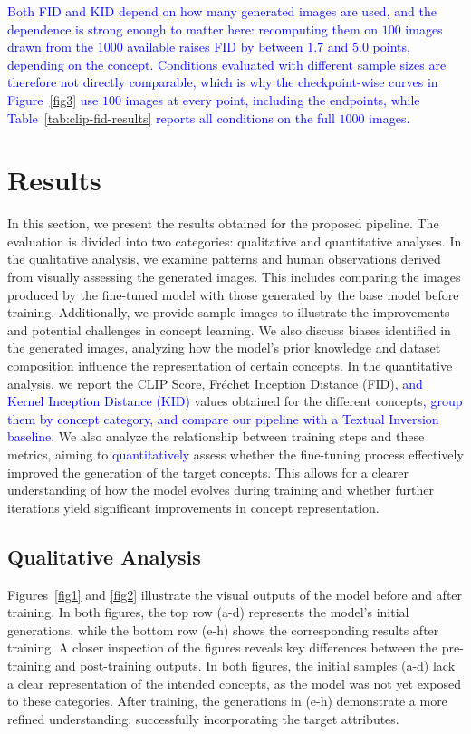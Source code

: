 \documentclass[pdflatex,sn-mathphys-num]{sn-jnl}%
\theoremstyle{thmstyleone}%
\theoremstyle{thmstyletwo}%
\theoremstyle{thmstylethree}%
\begin{document}
\textcolor{blue}{Both FID and KID depend on how many generated images are used, and the dependence is strong enough to matter here: recomputing them on $100$ images drawn from the $1000$ available raises FID by between $1.7$ and $5.0$ points, depending on the concept. Conditions evaluated with different sample sizes are therefore not directly comparable, which is why the checkpoint-wise curves in Figure~\ref{fig3} use $100$ images at every point, including the endpoints, while Table~\ref{tab:clip-fid-results} reports all conditions on the full $1000$ images.}

\section{Results}
\label{results}

In this section, we present the results obtained for the proposed pipeline. The evaluation is divided into two categories: qualitative and quantitative analyses. In the qualitative analysis, we examine patterns and human observations derived from visually assessing the generated images. This includes comparing the images produced by the fine-tuned model with those generated by the base model before training. Additionally, we provide sample images to illustrate the improvements and potential challenges in concept learning. We also discuss biases identified in the generated images, analyzing how the model's prior knowledge and dataset composition influence the representation of certain concepts. In the quantitative analysis, we report the CLIP Score, Fréchet Inception Distance (FID)\textcolor{blue}{, and Kernel Inception Distance (KID)} values obtained for the different concepts\textcolor{blue}{, group them by concept category, and compare our pipeline with a Textual Inversion baseline}. We also analyze the relationship between training steps and these metrics, aiming to \textcolor{blue}{quantitatively} assess whether the fine-tuning process effectively improved the generation of the target concepts. This allows for a clearer understanding of how the model evolves during training and whether further iterations yield significant improvements in concept representation.

\subsection{Qualitative Analysis}

Figures~\ref{fig1} and \ref{fig2} illustrate the visual outputs of the model before and after training. In both figures, the top row (a-d) represents the model’s initial generations, while the bottom row (e-h) shows the corresponding results after training. A closer inspection of the figures reveals key differences between the pre-training and post-training outputs. In both figures, the initial samples (a-d) lack a clear representation of the intended concepts, as the model was not yet exposed to these categories. After training, the generations in (e-h) demonstrate a more refined understanding, successfully incorporating the target attributes.
\end{document}
